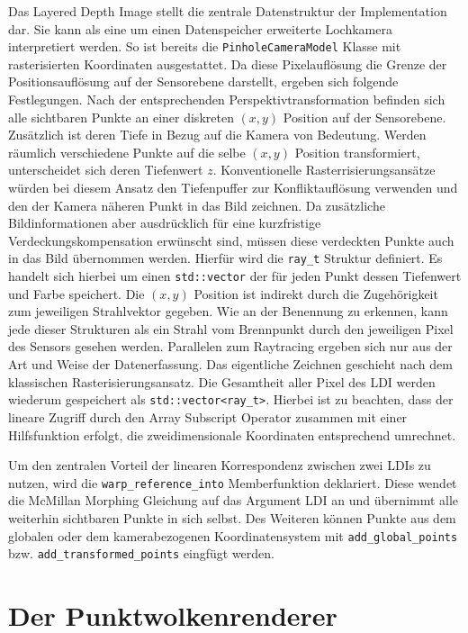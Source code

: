 \documentclass[hyperref, beleg, german]{cgvpub}
\begin{document}
Das Layered Depth Image stellt die zentrale Datenstruktur der Implementation
dar. Sie kann als eine um einen Datenspeicher erweiterte Lochkamera
interpretiert werden. So ist bereits die \texttt{PinholeCameraModel} Klasse mit
rasterisierten Koordinaten ausgestattet. Da diese Pixelauflösung die Grenze der
Positionsauflösung auf der Sensorebene darstellt, ergeben sich folgende
Festlegungen. Nach der entsprechenden Perspektivtransformation befinden sich
alle sichtbaren Punkte an einer diskreten \( (x, y) \) Position auf der
Sensorebene. Zusätzlich ist deren Tiefe in Bezug auf die Kamera von Bedeutung.
Werden räumlich verschiedene Punkte auf die selbe \( (x,y) \) Position
transformiert, unterscheidet sich deren Tiefenwert \(z\). Konventionelle
Rasterrisierungsansätze würden bei diesem Ansatz den Tiefenpuffer zur
Konfliktauflösung verwenden und den der Kamera näheren Punkt in das Bild
zeichnen. Da zusätzliche Bildinformationen aber ausdrücklich für eine
kurzfristige Verdeckungskompensation erwünscht sind, müssen diese verdeckten
Punkte auch in das Bild übernommen werden. Hierfür wird die \texttt{ray\_t}
Struktur definiert. Es handelt sich hierbei um einen \texttt{std::vector} der
für jeden Punkt dessen Tiefenwert und Farbe speichert. Die \( (x,y) \) Position
ist indirekt durch die Zugehörigkeit zum jeweiligen Strahlvektor gegeben. Wie
an der Benennung zu erkennen, kann jede dieser Strukturen als ein Strahl vom
Brennpunkt durch den jeweiligen Pixel des Sensors gesehen werden. Parallelen
zum Raytracing ergeben sich nur aus der Art und Weise der Datenerfassung. Das
eigentliche Zeichnen geschieht nach dem klassischen Rasterisierungsansatz. Die
Gesamtheit aller Pixel des LDI werden wiederum gespeichert als
\texttt{std::vector<ray\_t>}. Hierbei ist zu beachten, dass der lineare Zugriff
durch den Array Subscript Operator zusammen mit einer Hilfsfunktion erfolgt,
die zweidimensionale Koordinaten entsprechend umrechnet.

Um den zentralen Vorteil der linearen Korrespondenz zwischen zwei LDIs zu
nutzen, wird die \texttt{warp\_reference\_into} Memberfunktion deklariert.
Diese wendet die McMillan Morphing Gleichung auf das Argument LDI an und
übernimmt alle weiterhin sichtbaren Punkte in sich selbst. Des Weiteren können
Punkte aus dem globalen oder dem kamerabezogenen Koordinatensystem mit
\texttt{add\_global\_points} bzw. \texttt{add\_transformed\_points} eingfügt
werden.

\section{Der Punktwolkenrenderer}
\end{document}
